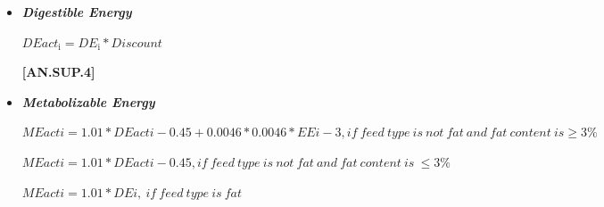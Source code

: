 \documentclass{article}
\begin{document}
\begin{refsection}
\begin{itemize}
    \begin{center}
    \(Discount = 1, if TDNconc < 60 \frac{(TDNconc - (0.18 * TDNconc - 10.3) * (DMI_{\text{to,maint}} - 1))}{TDNconc}\)
    \end{center}
    \vspace{0.5cm}
    
            {\raggedleft \textbf{[AN.SUP.3.1]}\par}
            \vspace{0.5cm}

    \begin{center}
    \(TDNact_{\text{i}} = TDN_{\text{i}} * Discount\)
    \end{center}
    \vspace{0.5cm}
    
            {\raggedleft \textbf{[AN.SUP.4.1]}\par}
            \vspace{0.5cm}

    \item \textbf{\textit{Digestible Energy}} 
    \vspace{0.25cm}

    \begin{center}
    \(DEact_{\text{i}} = DE_{\text{i}} * Discount\)
    \end{center}
    \vspace{0.5cm}
    
            {\raggedleft \textbf{[AN.SUP.4]}\par}
            \vspace{0.5cm}

    \item \textbf{\textit{Metabolizable Energy}} 
    \vspace{0.25cm}

    \begin{center}
    \(MEacti = 1.01 * DEacti - 0.45 + 0.0046 * 0.0046 * EEi - 3, if\ feed\ type\ is\ not\ fat\ and\ fat\ content\ is \geq 3\%\)
    \end{center}
    \vspace{0.5cm}

    \begin{center}
    \(MEacti = 1.01 * DEacti - 0.45, if\ feed\ type\ is\ not\ fat\ and\ fat\ content\ is\ \leq 3\%\)
    \end{center}
    \vspace{0.5cm}

    \begin{center}
    \(MEacti = 1.01 * DEi,\ if\ feed\ type\ is\ fat\)
    \end{center}
    \vspace{0.5cm}
    

\end{itemize}
\end{refsection}
\end{document}
